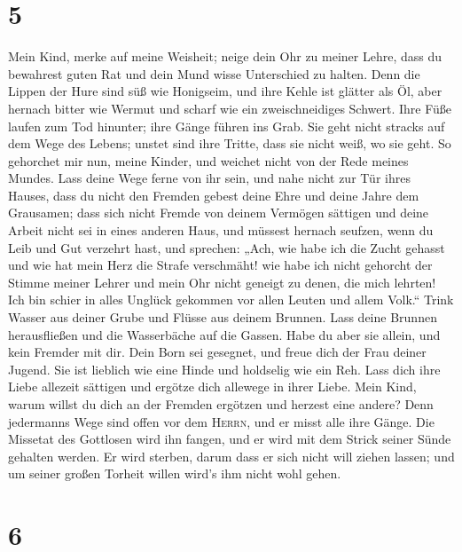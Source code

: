 \hypertarget{section-4}{%
\section{5}\label{section-4}}

 Mein Kind, merke auf meine Weisheit; neige dein Ohr zu
meiner Lehre,  dass du bewahrest guten Rat und dein Mund
wisse Unterschied zu halten.  Denn die Lippen der Hure
sind süß wie Honigseim, und ihre Kehle ist glätter als Öl,
 aber hernach bitter wie Wermut und scharf wie ein
zweischneidiges Schwert.  Ihre Füße laufen zum Tod
hinunter; ihre Gänge führen ins Grab.  Sie geht nicht
stracks auf dem Wege des Lebens; unstet sind ihre Tritte, dass sie nicht
weiß, wo sie geht.  So gehorchet mir nun, meine Kinder,
und weichet nicht von der Rede meines Mundes.  Lass deine
Wege ferne von ihr sein, und nahe nicht zur Tür ihres Hauses,
 dass du nicht den Fremden gebest deine Ehre und deine
Jahre dem Grausamen;  dass sich nicht Fremde von deinem
Vermögen sättigen und deine Arbeit nicht sei in eines anderen Haus,
 und müssest hernach seufzen, wenn du Leib und Gut
verzehrt hast,  und sprechen: „Ach, wie habe ich die
Zucht gehasst und wie hat mein Herz die Strafe verschmäht!
 wie habe ich nicht gehorcht der Stimme meiner Lehrer und
mein Ohr nicht geneigt zu denen, die mich lehrten!  Ich
bin schier in alles Unglück gekommen vor allen Leuten und allem Volk.``
 Trink Wasser aus deiner Grube und Flüsse aus deinem
Brunnen.  Lass deine Brunnen herausfließen und die
Wasserbäche auf die Gassen.  Habe du aber sie allein, und
kein Fremder mit dir.  Dein Born sei gesegnet, und freue
dich der Frau deiner Jugend.  Sie ist lieblich wie eine
Hinde und holdselig wie ein Reh. Lass dich ihre Liebe allezeit sättigen
und ergötze dich allewege in ihrer Liebe.  Mein Kind,
warum willst du dich an der Fremden ergötzen und herzest eine andere?
 Denn jedermanns Wege sind offen vor dem \textsc{Herrn},
und er misst alle ihre Gänge.  Die Missetat des Gottlosen
wird ihn fangen, und er wird mit dem Strick seiner Sünde gehalten
werden.  Er wird sterben, darum dass er sich nicht will
ziehen lassen; und um seiner großen Torheit willen wird's ihm nicht wohl
gehen.

\hypertarget{section-5}{%
\section{6}\label{section-5}}


